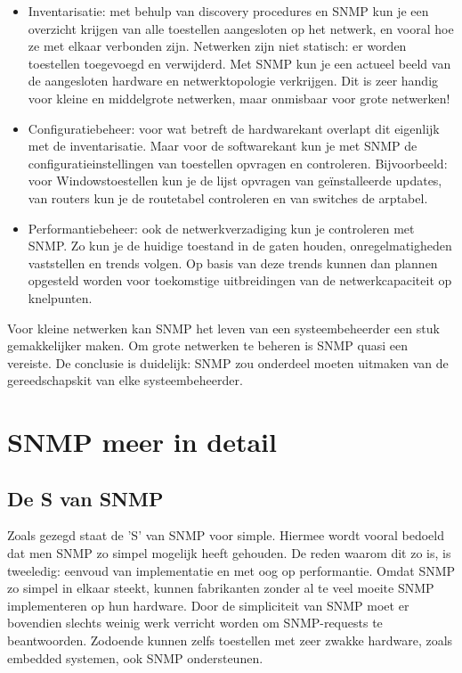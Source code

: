 \begin{itemize}
	\item Inventarisatie: met behulp van discovery procedures en SNMP kun je een overzicht krijgen van alle toestellen aangesloten op het netwerk,
	en vooral hoe ze met elkaar verbonden zijn. Netwerken zijn niet statisch: er worden toestellen toegevoegd en verwijderd. Met SNMP kun je een
	actueel beeld van de aangesloten hardware en netwerktopologie verkrijgen. Dit is zeer handig voor kleine en middelgrote netwerken, maar onmisbaar
	voor grote netwerken!
	
	\item Configuratiebeheer: voor wat betreft de hardwarekant overlapt dit eigenlijk met de inventarisatie. Maar voor de softwarekant kun je met SNMP de
	configuratieinstellingen van toestellen opvragen en controleren. Bijvoorbeeld: voor Windowstoestellen kun je de lijst opvragen van geïnstalleerde updates,
	van routers kun je de routetabel controleren en van switches de \gls{arptabel}.
	
	\item Performantiebeheer: ook de netwerkverzadiging kun je controleren met SNMP. Zo kun je de huidige toestand in de gaten houden,
	onregelmatigheden vaststellen en trends volgen. Op basis van deze trends kunnen dan plannen opgesteld worden voor toekomstige uitbreidingen
	van de netwerkcapaciteit op knelpunten.
\end{itemize}

Voor kleine netwerken kan SNMP het leven van een systeembeheerder een stuk gemakkelijker maken. Om grote netwerken te beheren is SNMP quasi een vereiste.
De conclusie is duidelijk: SNMP zou onderdeel moeten uitmaken van de gereedschapskit van elke systeembeheerder.



\section{SNMP meer in detail}

\subsection{De S van SNMP}

Zoals gezegd staat de 'S' van SNMP voor simple. Hiermee wordt vooral bedoeld dat men SNMP zo simpel mogelijk heeft gehouden.
De reden waarom dit zo is, is tweeledig: eenvoud van implementatie en met oog op performantie. %
Omdat SNMP zo simpel in elkaar steekt, kunnen fabrikanten zonder al te veel moeite SNMP implementeren op hun hardware.
Door de simpliciteit van SNMP moet er bovendien slechts weinig werk verricht worden om SNMP-requests te beantwoorden.
Zodoende kunnen zelfs toestellen met zeer zwakke hardware, zoals embedded systemen, ook SNMP ondersteunen.



